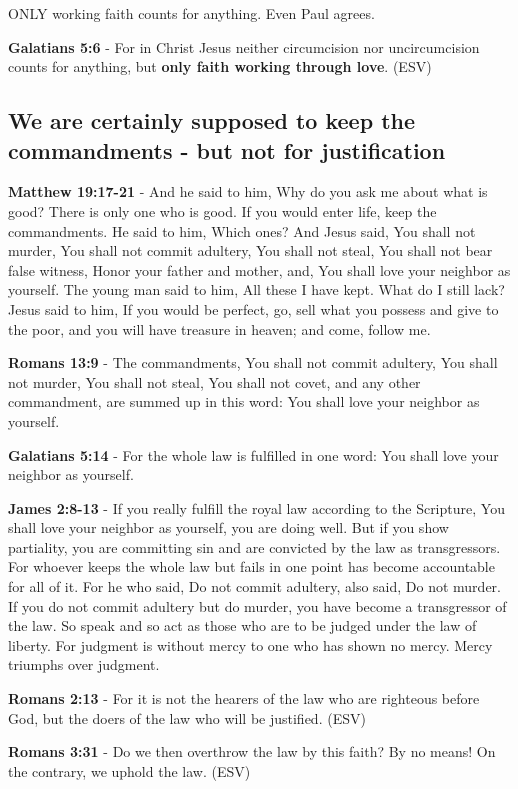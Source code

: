 \documentclass[11pt]{article}
\begin{document}
ONLY working faith counts for anything. Even Paul agrees.

\textbf{Galatians 5:6} - For in Christ Jesus neither circumcision nor uncircumcision counts for anything, but \textbf{only faith working through love}. (ESV)

\subsection{We are certainly supposed to keep the commandments - but not for justification}
\label{sec:org9d82aca}

\textbf{Matthew 19:17-21} - And he said to him, Why do you ask me about what is good? There is only one who is good. If you would enter life, keep the commandments.  He said to him, Which ones? And Jesus said, You shall not murder, You shall not commit adultery, You shall not steal, You shall not bear false witness, Honor your father and mother, and, You shall love your neighbor as yourself.  The young man said to him, All these I have kept. What do I still lack?  Jesus said to him, If you would be perfect, go, sell what you possess and give to the poor, and you will have treasure in heaven; and come, follow me.

\textbf{Romans 13:9} - The commandments, You shall not commit adultery, You shall not murder, You shall not steal, You shall not covet, and any other commandment, are summed up in this word: You shall love your neighbor as yourself.

\textbf{Galatians 5:14} - For the whole law is fulfilled in one word: You shall love your neighbor as yourself.

\textbf{James 2:8-13} - If you really fulfill the royal law according to the Scripture, You shall love your neighbor as yourself, you are doing well.  But if you show partiality, you are committing sin and are convicted by the law as transgressors.  For whoever keeps the whole law but fails in one point has become accountable for all of it.  For he who said, Do not commit adultery, also said, Do not murder. If you do not commit adultery but do murder, you have become a transgressor of the law.  So speak and so act as those who are to be judged under the law of liberty.  For judgment is without mercy to one who has shown no mercy. Mercy triumphs over judgment.

\textbf{Romans 2:13} - For it is not the hearers of the law who are righteous before God, but the doers of the law who will be justified. (ESV)

\textbf{Romans 3:31} - Do we then overthrow the law by this faith? By no means! On the contrary, we uphold the law. (ESV)
\end{document}
